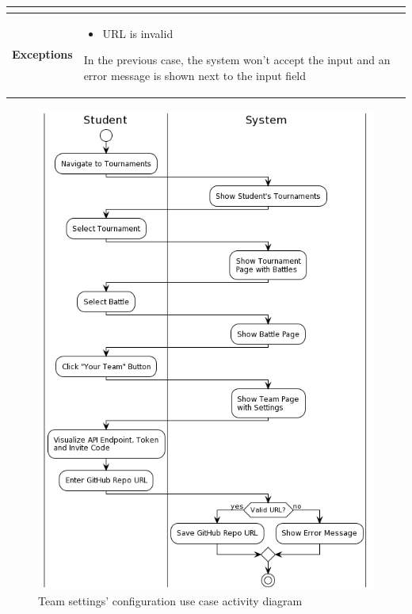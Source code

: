 \begin{center}
\begin{tabular}{ |c|m{10cm}| }
\begin{itemize}
        \end{itemize} \\
        \hline
        \textbf{Exceptions} & 
        \begin{itemize}
            \item URL is invalid
        \end{itemize} 
        In the previous case, the system won’t accept the input and an error message is shown next to the input field \\
        \hline
    \end{tabular}
    \begin{figure}[H]
        \hspace{45px}
        \includegraphics[scale=0.5]{Diagrams/activity_configureteamreposettings.png}
        \caption{Team settings' configuration use case activity diagram}
    \end{figure}

\end{center}
